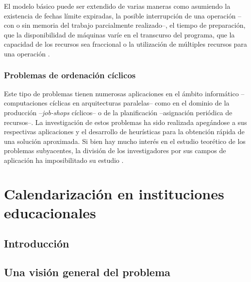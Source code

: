 \documentclass[spanish,draft,12pt,headsepline,footsepline,paper=letter]{scrreprt}
\begin{document}
El modelo básico puede ser extendido de varias maneras como asumiendo la existencia de fechas límite expiradas, la posible interrupción de una operación –con o sin memoria del trabajo parcialmente realizado–, el tiempo de preparación, que la disponibilidad de máquinas varíe en el transcurso del programa, que la capacidad de los recursos sea fraccional o la utilización de múltiples recursos para una operación \citep[p.~102]{gotha93les-problemes-dordonnancement}.


\subsection{Problemas de ordenación cíclicos}
\label{problemas_ordenacion_ciclicos}

Este tipo de problemas tienen numerosas aplicaciones en el ámbito informático –computaciones cíclicas en arquitecturas paralelas– como en el dominio de la producción –\textit{job-shops} cíclicos– o de la planificación –asignación periódica de recursos–. La investigación de estos problemas ha sido realizada apegándose a sus respectivas aplicaciones y el desarrollo de heurísticas para la obtención rápida de una solución aproximada. Si bien hay mucho interés en el estudio teorético de los problemas subyacentes, la división de los investigadores por sus campos de aplicación ha imposibilitado su estudio \citep[p.~131]{gotha93les-problemes-dordonnancement}.

\chapter{Calendarización en instituciones educacionales}

\section{Introducción}
\label{introduccion_vision_general}

%
\section{Una visión general del problema}
\label{vision_general_problema}
\end{document}
